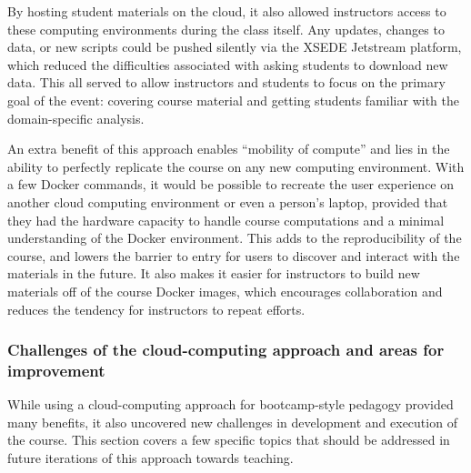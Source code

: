 By hosting student materials on the cloud, it also allowed instructors
access to these computing environments during the class itself. Any updates,
changes to data, or new scripts could be pushed silently via the XSEDE Jetstream
platform, which reduced the difficulties associated with asking students to
download new data. This all served to allow instructors and students to focus on
the primary goal of the event: covering course material and getting students
familiar with the domain-specific analysis.

An extra benefit of this approach enables “mobility of compute” and lies in the
ability to perfectly replicate the course on any new computing environment. With
a few Docker commands, it would be possible to recreate the user experience on
another cloud computing environment or even a person's laptop, provided that
they had the hardware capacity to handle course computations and a minimal
understanding of the Docker environment. This adds to the reproducibility of the
course, and lowers the barrier to entry for users to discover and interact with
the materials in the future. It also makes it easier for instructors to build
new materials off of the course Docker images, which encourages collaboration
and reduces the tendency for instructors to repeat efforts.

\subsubsection{Challenges of the cloud-computing approach and areas for improvement}

While using a cloud-computing approach for bootcamp-style pedagogy provided many
benefits, it also uncovered new challenges in development and execution of the
course. This section covers a few specific topics that should be addressed in
future iterations of this approach towards teaching.

